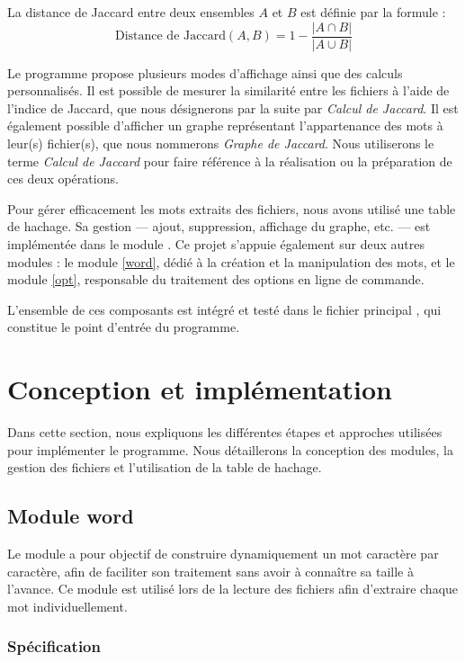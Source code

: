 \documentclass[a4paper, 12pt]{article}
\newcommand{\code}{\commandbox}
\begin{document}
La distance de Jaccard entre deux ensembles $A$ et $B$ est définie par la formule :
$$
\text{Distance de Jaccard}(A, B) = 1 - \frac{|A \cap B|}{|A \cup B|}
$$

Le programme propose plusieurs modes d'affichage ainsi que des calculs personnalisés.  
Il est possible de mesurer la similarité entre les fichiers à l'aide de l'indice de Jaccard, que nous désignerons par la suite par \textit{Calcul de Jaccard}.  
Il est également possible d'afficher un graphe représentant l'appartenance des mots à leur(s) fichier(s), que nous nommerons \textit{Graphe de Jaccard}.  
Nous utiliserons le terme \textit{Calcul de Jaccard} pour faire référence à la réalisation ou la préparation de ces deux opérations.

Pour gérer efficacement les mots extraits des fichiers, nous avons utilisé une table de hachage. Sa gestion — ajout, suppression, affichage du graphe, etc. — est implémentée dans le module \code{jaccard}. Ce projet s'appuie également sur deux autres modules : le module \code{word} \autoref{word}, dédié à la création et la manipulation des mots, et le module \code{opt} \autoref{opt}, responsable du traitement des options en ligne de commande.

L'ensemble de ces composants est intégré et testé dans le fichier principal \code{main.c}, qui constitue le point d'entrée du programme.


\section{Conception et implémentation}

Dans cette section, nous expliquons les différentes étapes et approches utilisées pour implémenter le programme. Nous détaillerons la conception des modules, la gestion des fichiers et l'utilisation de la table de hachage.

\subsection{Module word}

\label{word}

Le module \code{word} a pour objectif de construire dynamiquement un mot caractère par caractère, afin de faciliter son traitement sans avoir à connaître sa taille à l'avance. Ce module est utilisé lors de la lecture des fichiers afin d'extraire chaque mot individuellement.

\subsubsection{Spécification}
\end{document}

